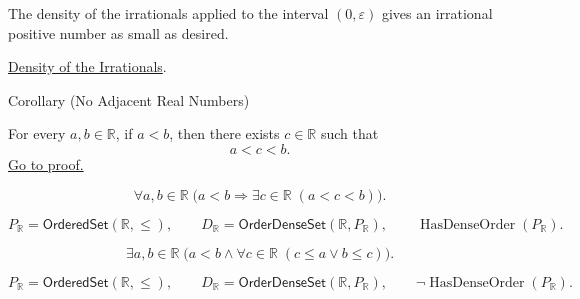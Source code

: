 \begin{remark*}[Interpretation]
The density of the irrationals applied to the interval $(0,\varepsilon)$ gives
an irrational positive number as small as desired.
\end{remark*}

\begin{dependencies}
\hyperref[thm:density-of-irrationals-in-reals]{Density of the Irrationals}.
\end{dependencies}

\begin{corollarybox}{Corollary (No Adjacent Real Numbers)}
\begin{corollary}
\label{cor:no-adjacent-real-numbers}
For every $a,b\in\mathbb{R}$, if $a<b$, then there exists
$c\in\mathbb{R}$ such that
\[
  a<c<b.
\]
\hyperref[prf:no-adjacent-real-numbers]{Go to proof.}
\end{corollary}
\end{corollarybox}
\begin{remark*}
\[
\forall a,b\in\mathbb{R}\;\bigl(a<b\Longrightarrow
\exists c\in\mathbb{R}\;(a<c<b)\bigr).
\]
\end{remark*}
\begin{remark*}
\[
P_{\mathbb{R}}=\mathsf{OrderedSet}(\mathbb{R},\leq),\qquad
D_{\mathbb{R}}=\mathsf{OrderDenseSet}(\mathbb{R},P_{\mathbb{R}}),\qquad
\operatorname{HasDenseOrder}(P_{\mathbb{R}}).
\]
\end{remark*}
\begin{remark*}
\[
\exists a,b\in\mathbb{R}\;
\bigl(a<b\land \forall c\in\mathbb{R}\;(c\le a\lor b\le c)\bigr).
\]
\end{remark*}
\begin{remark*}
\[
P_{\mathbb{R}}=\mathsf{OrderedSet}(\mathbb{R},\leq),\qquad
D_{\mathbb{R}}=\mathsf{OrderDenseSet}(\mathbb{R},P_{\mathbb{R}}),\qquad
\neg\operatorname{HasDenseOrder}(P_{\mathbb{R}}).
\]
\end{remark*}

